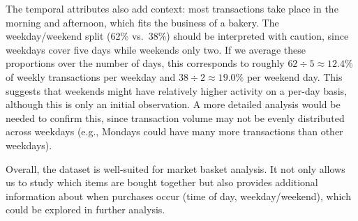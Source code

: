 The temporal attributes also add context: most transactions take place in the morning and afternoon, which fits the business of a bakery.  
The weekday/weekend split (62\% vs.\ 38\%) should be interpreted with caution, since weekdays cover five days while weekends only two.  
If we average these proportions over the number of days, this corresponds to roughly $62 \div 5 \approx 12.4\%$ of weekly transactions per weekday and $38 \div 2 \approx 19.0\%$ per weekend day.  
This suggests that weekends might have relatively higher activity on a per-day basis, although this is only an initial observation.  
A more detailed analysis would be needed to confirm this, since transaction volume may not be evenly distributed across weekdays (e.g., Mondays could have many more transactions than other weekdays).
 

Overall, the dataset is well-suited for market basket analysis.  
It not only allows us to study which items are bought together but also provides additional 
information about when purchases occur 
(time of day, weekday/weekend), which could be explored in further analysis.
